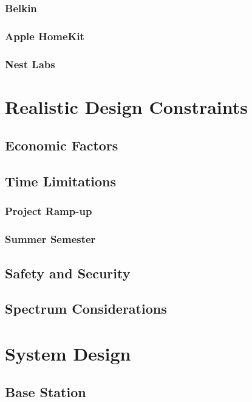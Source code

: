   \subsubsection{Belkin}
\lipsum[1]
  \subsubsection{Apple HomeKit}
\lipsum[1]
  \subsubsection{Nest Labs}
\lipsum[1]
\section{Realistic Design Constraints}
\lipsum[1]
 \subsection{Economic Factors}
\lipsum[1]
 \subsection{Time Limitations}
\lipsum[1]
  \subsubsection{Project Ramp-up}
\lipsum[1]
  \subsubsection{Summer Semester}
\lipsum[1]
 \subsection{Safety and Security}
\lipsum[1]
 \subsection{Spectrum Considerations}
\lipsum[1]
\section{System Design}
\lipsum[1]
 \subsection{Base Station}
\lipsum[1]
